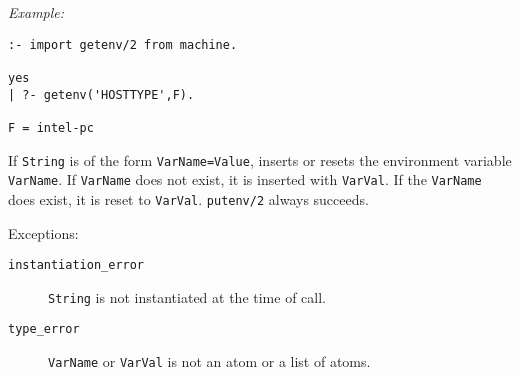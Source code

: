\begin{description}
{\em Example:}
\begin{verbatim}
:- import getenv/2 from machine.

yes
| ?- getenv('HOSTTYPE',F).

F = intel-pc
\end{verbatim}

\noindent
If {\tt String} is of the form {\tt VarName=Value}, inserts or resets
the environment variable {\tt VarName}.  If {\tt VarName} does not
exist, it is inserted with {\tt VarVal}.  If the {\tt VarName} does
exist, it is reset to {\tt VarVal}.  {\tt putenv/2} always succeeds.

Exceptions:
    \begin{description}
    \item[{\tt instantiation\_error}] {\tt String} is
      not instantiated at the time of call.
    \item[{\tt type\_error}]
        {\tt VarName} or {\tt VarVal} is not an atom or a list of atoms.
    \end{description}

\end{description}

